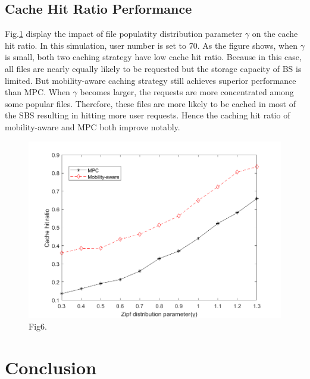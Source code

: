 \documentclass[conference]{IEEEtran}
\begin{document}
\subsection{Cache Hit Ratio Performance}
Fig.\ref{fig 6} display the impact of file populatity distribution parameter $\gamma$ on the cache hit ratio. In this simulation, user number is set to 70. As the figure shows, when $\gamma$is small, both two caching strategy have low cache hit ratio. Because in this case, all files are nearly equally likely to be requested but the storage capacity of BS is limited. But mobility-aware caching strategy still achieves superior performance than MPC. When $\gamma$ becomes larger, the requests are more concentrated among some popular files. Therefore, these files are more likely to be cached in most of the SBS resulting in hitting more user requests. Hence the caching hit ratio of mobility-aware and MPC both improve notably.
\begin{figure}[htbp]
 \centerline{\includegraphics[scale=0.3]{fig6.png}}
 \caption{Fig6.}
 \label{fig 6}
\end{figure}
\section{Conclusion}
\end{document}
